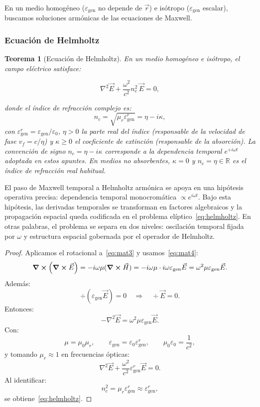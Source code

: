 \documentclass[12pt, a4paper]{article}
\theoremstyle{plain}
\newtheorem{teorema}{Teorema}[section]
\theoremstyle{definition}
\theoremstyle{remark}
\newcommand{\R}{\mathbb{R}}
\newcommand{\ve}[1]{\vec{#1}}
\begin{document}
En un medio homogéneo ($\varepsilon_\text{gen}$ no depende de $\ve{r}$)
e isótropo ($\varepsilon_\text{gen}$ escalar), buscamos soluciones armónicas
de las ecuaciones de Maxwell.

\subsubsection{Ecuación de Helmholtz}

\begin{teorema}[Ecuación de Helmholtz]
En un medio homogéneo e isótropo, el campo eléctrico satisface:
\begin{mdframed}[style=resultado]
\begin{equation}
  \nabla^2\ve{E} + \frac{\omega^2}{c^2}n_c^2\,\ve{E} = 0,
  \label{eq:helmholtz}
\end{equation}
\end{mdframed}
donde el \emph{índice de refracción complejo} es:
\begin{equation}
  n_c = \sqrt{\mu_r\varepsilon_\text{gen}^r} = \eta - i\kappa,
  \label{eq:nc}
\end{equation}
con $\varepsilon_\text{gen}^r = \varepsilon_\text{gen}/\varepsilon_0$,
$\eta > 0$ la \emph{parte real} del índice (responsable de la velocidad de
fase $v_f = c/\eta$) y $\kappa \geq 0$ el \emph{coeficiente de extinción}
(responsable de la absorción). La convención de signo $n_c = \eta - i\kappa$
corresponde a la dependencia temporal $e^{+i\omega t}$ adoptada en estos apuntes.
En medios no absorbentes, $\kappa = 0$ y $n_c = \eta \in \R$ es el índice de
refracción real habitual.
\end{teorema}

El paso de Maxwell temporal a Helmholtz armónica se apoya en una hipótesis
operativa precisa: dependencia temporal monocromática
$\propto e^{i\omega t}$. Bajo esta hipótesis, las derivadas temporales se
transforman en factores algebraicos y la propagación espacial queda codificada
en el problema elíptico~\eqref{eq:helmholtz}. En otras palabras, el problema se
separa en dos niveles: oscilación temporal fijada por $\omega$ y estructura
espacial gobernada por el operador de Helmholtz.

\begin{proof}
Aplicamos el rotacional a~\eqref{eq:mat3} y usamos~\eqref{eq:mat4}:
\[
  \curl(\curl\ve{E})
  = -i\omega\mu(\curl\ve{H})
  = -i\omega\mu\cdot i\omega\varepsilon_\text{gen}\ve{E}
  = \omega^2\mu\varepsilon_\text{gen}\ve{E}.
\]
Además:
\[
  \div(\varepsilon_\text{gen}\ve{E})=0
  \quad\Rightarrow\quad
  \div\ve{E}=0.
\]
Entonces:
\[
  -\nabla^2\ve{E} = \omega^2\mu\varepsilon_\text{gen}\ve{E}.
\]
Con:
\[
  \mu = \mu_0\mu_r,
  \qquad
  \varepsilon_\text{gen} = \varepsilon_0\varepsilon_\text{gen}^r,
  \qquad
  \mu_0\varepsilon_0 = \frac{1}{c^2},
\]
y tomando $\mu_r\approx 1$ en frecuencias ópticas:
\[
  \nabla^2\ve{E} + \frac{\omega^2}{c^2}\varepsilon_\text{gen}^r\ve{E} = 0.
\]
Al identificar:
\[
  n_c^2 = \mu_r\varepsilon_\text{gen}^r \approx \varepsilon_\text{gen}^r,
\]
se obtiene~\eqref{eq:helmholtz}.
\end{proof}
\end{document}
